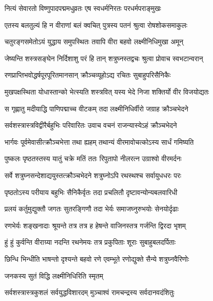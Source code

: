 \twolineshloka
{नित्यं सेवारतो विष्णुपादपद्ममधुव्रतः}
{एष स्वधर्मनिरतः परधर्मपराङ्मुखः}%

\twolineshloka
{एतस्य बलतुल्यं हि न वीराणां बलं क्वचित्}
{पुत्रस्य पतनं श्रुत्वा रोषशोकसमाकुलः}%

\twolineshloka
{चतुरङ्गसमेतोऽयं युद्धाय समुपस्थितः}
{तवापि वीरा बहवो लक्ष्मीनिधिमुखा अमून्}%

\twolineshloka
{जेष्यन्ति शस्त्रसङ्घेन निर्दिशाशु परं हि तान्}
{शत्रुघ्नस्तद्वचः श्रुत्वा प्रोवाच स्वभटान्वरान्}%

\twolineshloka
{रणप्राप्तिभवोद्धर्षपूरपूरितमानसान्}
{क्रौञ्चव्यूहोऽद्य रचितः सुबाहुपरिसैनिकैः}%

\twolineshloka
{मुखपक्षस्थिता योधास्तान्को भेत्स्यति शस्त्रवित्}
{यस्य भेदे निजा शक्तिर्यो वीर विजयोद्यतः}%

\twolineshloka
{स गृह्णातु मदीयाद्धि पाणिपद्माच्च वीटकम्}
{तदा लक्ष्मीनिधिर्वीरो जग्राह क्रौञ्चभेदने}%

\twolineshloka
{सर्वशस्त्रास्त्रविद्वीरैर्बहुभिः परिवारितः}
{उवाच वचनं राजन्यास्येऽहं क्रौञ्चभेदने}%

\twolineshloka
{भार्गवः पूर्वमेवासीत्क्रौञ्चभेत्ता तथा ह्यहम्}
{तथान्यं वीरमावोचत्कोऽस्य सार्धं गमिष्यति}%

\twolineshloka
{पुष्कलः पृष्ठतस्तस्य यातुं चक्रे मतिं ततः}
{रिपुतापो नीलरत्न उग्राश्वो वीरमर्दनः}%

\twolineshloka
{सर्वे शत्रुघ्नसन्देशाद्ययुस्तत्क्रौञ्चभेदने}
{शत्रुघ्नोऽपि रथस्थश्च सर्वायुधधरः परः}%

\twolineshloka
{पृष्ठतोऽस्य परीयाय बहुभिः सैनिकैर्वृतः}
{तदा प्रचलितौ दृष्टावन्योन्यबलवारिधी}%

\twolineshloka
{प्रलयं कर्तुमुद्युक्तौ जगतः सुतरङ्गिणौ}
{तदा भेर्यः समाजघ्नुरुभयोः सेनयोर्दृढाः}%

\twolineshloka
{रणभेर्यः शङ्खनादाः श्रूयन्ते तत्र तत्र ह}
{हेषन्ते वाजिनस्तत्र गर्जन्ति द्विरदा भृशम्}%

\twolineshloka
{हुं हुं कुर्वन्ति वीराग्र्या नदन्ति रथनेमयः}
{तत्र प्रकुपिताः शूराः सुबाहुबलदर्पिताः}%

\twolineshloka
{छिन्धि भिन्धीति भाषन्तो दृश्यन्ते बहवो रणे}
{एवम्भूते रणोद्युक्ते सैन्ये शत्रुघ्नवैरिणोः}%



\onelineshloka
{जनकस्य सुतं विद्धि लक्ष्मीनिधिरिति स्मृतम्}%

\twolineshloka
{सर्वशस्त्रास्त्रकुशलं सर्वयुद्धविशारदम्}
{मुञ्चाश्वं रामचन्द्रस्य सर्वदानवदंशितुः}%

